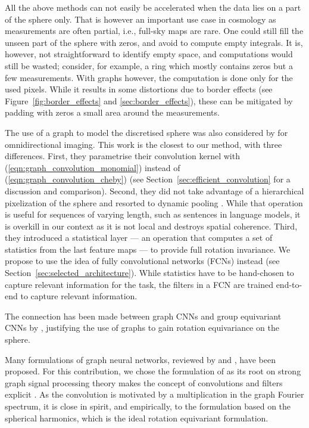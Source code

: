 \documentclass[final,twocolumn,3p,times,authoryear]{elsarticle}
\newcommand{\todo}[1]{{\color[rgb]{.6,.1,.6}{#1}}}
\newcommand{\figref}[1]{Figure~\ref{fig:#1}}
\newcommand{\secref}[1]{Section~\ref{sec:#1}}
\newcommand{\eqnref}[1]{(\ref{eqn:#1})}
\newcommand{\1}{\b{1}}              %
\newcommand{\0}{\b{0}}              %
\begin{document}
All the above methods can not easily be accelerated when the data lies on a part of the sphere only.
That is however an important use case in cosmology as measurements are often partial, i.e., full-sky maps are rare.
One could still fill the unseen part of the sphere with zeros, and avoid to compute empty integrals.
It is, however, not straightforward to identify empty space, and computations would still be wasted; consider, for example, a ring which mostly contains zeros but a few measurements.
With graphs however, the computation is done only for the used pixels.
While it results in some distortions due to border effects (see \figref{border_effects} and \ref{sec:border_effects}), these can be mitigated by padding with zeros a small area around the measurements.

The use of a graph to model the discretised sphere was also considered by \citet{khasanova2017graphomni} for omnidirectional imaging.
This work is the closest to our method, with three differences. First, they parametrise their convolution kernel with \eqnref{graph_convolution_monomial} instead of \eqnref{graph_convolution_cheby} (see \secref{efficient_convolution} for a discussion and comparison).
Second, they did not take advantage of a hierarchical pixelization of the sphere and resorted to dynamic pooling \citep{kalchbrenner2014dcnn}. While that operation is useful for sequences of varying length, such as sentences in language models, it is overkill in our context as it is not local and destroys spatial coherence.
Third, they introduced a statistical layer --- an operation that computes a set of statistics from the last feature maps --- to provide full rotation invariance. We propose to use the idea of fully convolutional networks (FCNs) instead (see \secref{selected_architecture}). While statistics have to be hand-chosen to capture relevant information for the task, the filters in a FCN are trained end-to-end to capture relevant information.

The connection has been made between graph CNNs and group equivariant CNNs by \citet{kondor2018equivariance}, justifying the use of graphs to gain rotation equivariance on the sphere. \todo{More here.}

Many formulations of graph neural networks, reviewed by \citet{bronstein2017review} and \citet{hamilton2017review}, have been proposed. For this contribution, we chose the formulation of \citet{defferrard2016convolutional} as its root on strong graph signal processing theory makes the concept of convolutions and filters explicit \citep{shuman2013emerging}. As the convolution is motivated by a multiplication in the graph Fourier spectrum, it is close in spirit, and empirically, to the formulation based on the spherical harmonics, which is the ideal rotation equivariant formulation.
\end{document}

